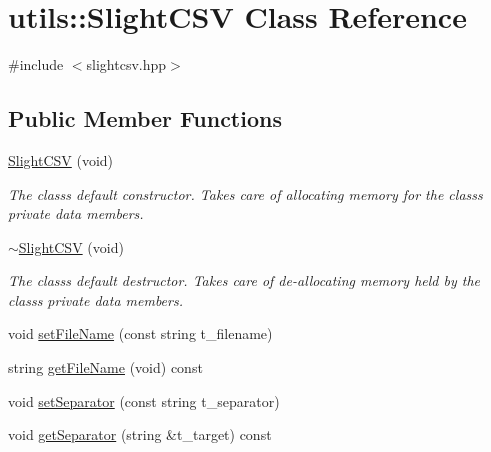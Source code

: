 \hypertarget{classutils_1_1SlightCSV}{}\section{utils\+:\+:Slight\+C\+SV Class Reference}
\label{classutils_1_1SlightCSV}


{\ttfamily \#include $<$slightcsv.\+hpp$>$}

\subsection*{Public Member Functions}
\begin{DoxyCompactItemize}
\item 
\mbox{\label{classutils_1_1SlightCSV_a9f30e030dd5eff9f7df564c9cd7a81e8}} 
\hyperlink{classutils_1_1SlightCSV_a9f30e030dd5eff9f7df564c9cd7a81e8}{Slight\+C\+SV} (void)
\begin{DoxyCompactList}\small\item\em The class\textquotesingle{}s default constructor. Takes care of allocating memory for the class\textquotesingle{}s private data members. \end{DoxyCompactList}\item 
\mbox{\label{classutils_1_1SlightCSV_abeb9790f681d93c6f8a8ba210678565b}} 
\hyperlink{classutils_1_1SlightCSV_abeb9790f681d93c6f8a8ba210678565b}{$\sim$\+Slight\+C\+SV} (void)
\begin{DoxyCompactList}\small\item\em The class\textquotesingle{}s default destructor. Takes care of de-\/allocating memory held by the class\textquotesingle{}s private data members. \end{DoxyCompactList}\item 
void \hyperlink{classutils_1_1SlightCSV_aba4b71a4a4bfa2317985a1a9cd53fc85}{set\+File\+Name} (const string t\+\_\+filename)
\item 
string \hyperlink{classutils_1_1SlightCSV_ad689937346e0d6dd37597e7c3458e164}{get\+File\+Name} (void) const
\item 
void \hyperlink{classutils_1_1SlightCSV_a1192b4987bbe595ee893ac8fdc7ebd45}{set\+Separator} (const string t\+\_\+separator)
\item 
void \hyperlink{classutils_1_1SlightCSV_ac5a81169c5da9aade5d96935428c73ea}{get\+Separator} (string \&t\+\_\+target) const

\end{DoxyCompactItemize}
